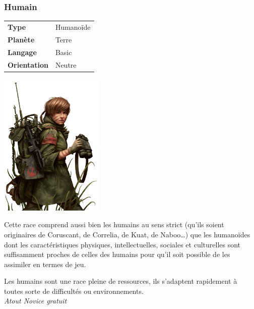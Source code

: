 \subsubsection{Humain}
\begin{samepage}
	\begin{flushright}
		\begin{tabular}{ l l }
			\textbf{Type} 			& Humanoïde \\
		   	\textbf{Planète} 		& Terre \\
		   	\textbf{Langage} 		& Basic \\
		   	\textbf{Orientation} 	& Neutre \\
		\end{tabular}
	\end{flushright}

	\vspace{-6\baselineskip}
	\includegraphics[width=5cm]{img/personnages/races/humain.png} 
\end{samepage}

Cette race comprend aussi bien les humains au sens strict (qu’ils soient originaires de Coruscant, de Correlia, de Kuat, de Naboo\ldots) que les humanoïdes dont les caractéristiques physiques, intellectuelles, sociales et culturelles sont suffisamment proches de celles des humains pour qu’il soit possible de les assimiler en termes de jeu.

\begin{description}[align=left]
\item [Adaptabilité] 	%
	Les humains sont une race pleine de ressources, ils s’adaptent rapidement à toutes sorte de difficultés ou environnements.\\
	\emph{Atout Novice gratuit}
\end{description}